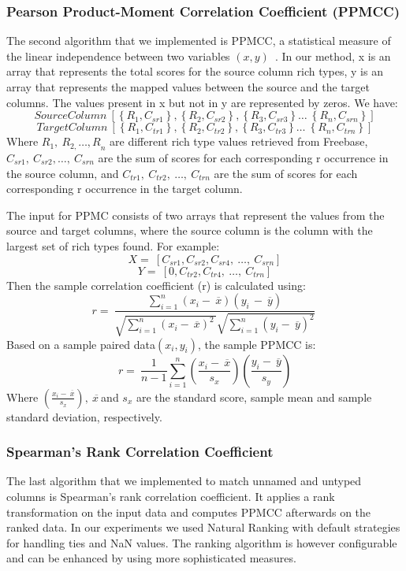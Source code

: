 \subsubsection{Pearson Product-Moment Correlation Coefficient (PPMCC)}

The second algorithm that we implemented is PPMCC, a statistical measure of the linear independence between two variables $\left(x,y\right)$~\cite{Kowalski:RoyalStat:72}. In our method, x is an array that represents the total scores for the source column rich types, y is an array that represents the mapped values between the source and the target columns. The values present in x but not in y are represented by zeros. We have:
\[SourceColumn\ \left[\left\{R_1,C_{sr1}\right\},\left\{R_2,C_{sr2}\right\},\left\{R_3,C_{sr3}\right\}\dots \ \left\{R_n,C_{srn}\right\}\right]\]
\[TargetColumn\ \left[\left\{R_1,C_{tr1}\right\},\left\{R_2,C_{tr2}\right\},\left\{R_3,C_{tr3}\right\}\dots \ \left\{R_n,C_{trn}\right\}\right]\]
Where $R_1,\ R_{2,}{\dots ,R}_n$ are different rich type values retrieved from Freebase, $C_{sr1},\ C_{sr2},\dots ,\ C_{srn}$ are the sum of scores for each corresponding r occurrence in the source column, and $C_{tr1},\ C_{tr2},\ \dots ,\ C_{trn}$ are the sum of scores for each corresponding r occurrence in the target column.

The input for PPMC consists of two arrays that represent the values from the source and target columns, where the source column is the column with the largest set of rich types found. For example:
\[X=\ \left[C_{sr1},C_{sr2},C_{sr4},\ \dots ,\ C_{srn}\right]\]
\[Y=\ \left[0,C_{tr2},C_{tr4},\ \dots ,\ C_{trn}\right]\]
Then the sample correlation coefficient (r) is calculated using:
\[r=\ \frac{\sum^n_{i=1}{\left(x_i-\ \overline{x}\right)\left(y_{i\ }-\ \overline{y}\right)}}{\sqrt{\sum^n_{i=1}{{\left(x_i-\ \overline{x}\right)}^{2\ }}}\sqrt{\sum^n_{i=1}{{\left(y_i-\ \overline{y}\right)}^2}}}\ \]
Based on a sample paired data$\left(x_i,y_i\right)$, the sample PPMCC is:
\[r=\ \frac{1}{n-1}\sum^n_{i=1}{\left(\frac{x_i-\ \overline{x}}{s_x}\right)}\left(\frac{y_i-\ \overline{y}}{s_y}\right)\]
Where $\left(\frac{x_i-\ \overline{x}}{s_x}\right),\ \overline{x\ }$and $s_x$ are the standard score, sample mean and sample standard deviation, respectively.


\subsubsection{Spearman's Rank Correlation Coefficient}
The last algorithm that we implemented to match unnamed and untyped columns is Spearman's rank correlation coefficient. It applies a rank transformation on the input data and computes PPMCC afterwards on the ranked data. In our experiments we used Natural Ranking with default strategies for handling ties and NaN values. The ranking algorithm is however configurable and can be enhanced by using more sophisticated measures.


